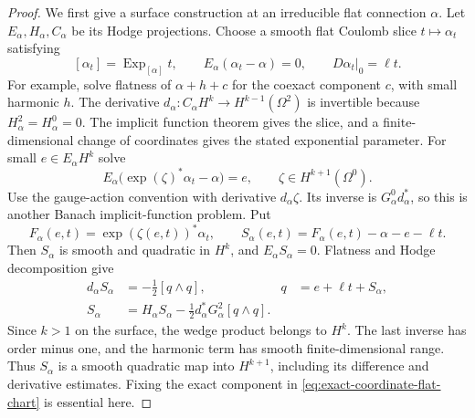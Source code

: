 \documentclass[11pt]{amsart}
\theoremstyle{definition}
\theoremstyle{remark}
\theoremstyle{plain}
\begin{document}
\begin{proof}
We first give a surface construction at an irreducible flat
connection $\alpha$. Let $E_\alpha,H_\alpha,C_\alpha$ be its
Hodge projections. Choose a smooth flat Coulomb slice
$t\mapsto\alpha_t$ satisfying
\[
 [\alpha_t]=\operatorname{Exp}_{[\alpha]}t,\qquad
 E_\alpha(\alpha_t-\alpha)=0,\qquad
 D\alpha_t|_0=\ell t.
\]
For example, solve flatness of $\alpha+h+c$ for the coexact
component $c$, with small harmonic $h$. The derivative
$d_\alpha:C_\alpha H^k\to H^{k-1}(\Omega^2)$ is invertible
because $H^2_\alpha=H^0_\alpha=0$. The implicit function
theorem gives the slice, and a finite-dimensional change of
coordinates gives the stated exponential parameter.
For small $e\in E_\alpha H^k$ solve
\begin{equation}\label{eq:exact-coordinate-flat-chart}
 E_\alpha\bigl(\exp(\zeta)^*\alpha_t-\alpha\bigr)=e,
 \qquad \zeta\in H^{k+1}(\Omega^0).
\end{equation}
Use the gauge-action convention with derivative $d_\alpha\zeta$.
Its inverse is $G^0_\alpha d_\alpha^*$, so this is another
Banach implicit-function problem. Put
\[
 F_\alpha(e,t)=\exp(\zeta(e,t))^*\alpha_t,\qquad
 S_\alpha(e,t)=F_\alpha(e,t)-\alpha-e-\ell t.
\]
Then $S_\alpha$ is smooth and quadratic in $H^k$, and
$E_\alpha S_\alpha=0$. Flatness and Hodge decomposition give
\begin{equation}\label{eq:flat-chart-derivative-gain}
 \begin{aligned}
  d_\alpha S_\alpha&=-\tfrac12[q\wedge q],
       &q&=e+\ell t+S_\alpha,\\
  S_\alpha&=H_\alpha S_\alpha
              -\tfrac12d_\alpha^*G^2_\alpha[q\wedge q].
 \end{aligned}
\end{equation}
Since $k>1$ on the surface, the wedge product belongs to $H^k$.
The last inverse has order minus one, and the harmonic term
has smooth finite-dimensional range. Thus $S_\alpha$ is a
smooth quadratic map into $H^{k+1}$, including its difference
and derivative estimates. Fixing the exact component in
\eqref{eq:exact-coordinate-flat-chart} is essential here.


\end{proof}
\end{document}
